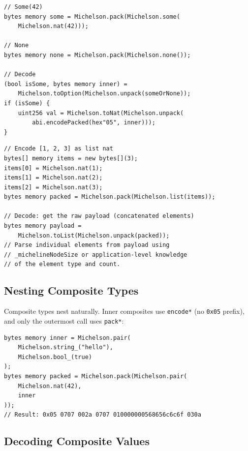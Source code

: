\documentclass[11pt,a4paper]{article}
\begin{document}
\begin{codebox}
\begin{lstlisting}[language=Solidity]
// Some(42)
bytes memory some = Michelson.pack(Michelson.some(
    Michelson.nat(42)));

// None
bytes memory none = Michelson.pack(Michelson.none());

// Decode
(bool isSome, bytes memory inner) =
    Michelson.toOption(Michelson.unpack(someOrNone));
if (isSome) {
    uint256 val = Michelson.toNat(Michelson.unpack(
        abi.encodePacked(hex"05", inner)));
}
\end{lstlisting}
\end{codebox}

\begin{codebox}
\begin{lstlisting}[language=Solidity]
// Encode [1, 2, 3] as list nat
bytes[] memory items = new bytes[](3);
items[0] = Michelson.nat(1);
items[1] = Michelson.nat(2);
items[2] = Michelson.nat(3);
bytes memory packed = Michelson.pack(Michelson.list(items));

// Decode: get the raw payload (concatenated elements)
bytes memory payload =
    Michelson.toList(Michelson.unpack(packed));
// Parse individual elements from payload using
// _michelineNodeSize or application-level knowledge
// of the element type and count.
\end{lstlisting}
\end{codebox}

\subsection{Nesting Composite Types}

Composite types nest naturally. Inner composites use \texttt{encode*} (no
\texttt{0x05} prefix), and only the outermost call uses \texttt{pack*}:

\begin{codebox}
\begin{lstlisting}[language=Solidity]
bytes memory inner = Michelson.pair(
    Michelson.string_("hello"),
    Michelson.bool_(true)
);
bytes memory packed = Michelson.pack(Michelson.pair(
    Michelson.nat(42),
    inner
));
// Result: 0x05 0707 002a 0707 010000000568656c6c6f 030a
\end{lstlisting}
\end{codebox}

\subsection{Decoding Composite Values}
\end{document}
